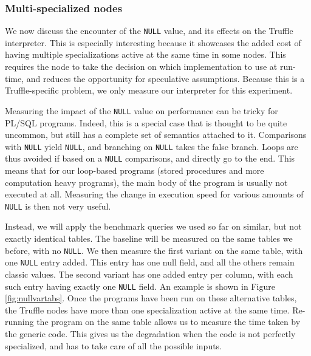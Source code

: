 \documentclass[twoside,11pt,a4paper]{article}
\newcommand{\pls}[1]{\small\texttt{#1}\normalsize}
\newcommand{\plsnull}{\pls{NULL}}
\begin{document}
\subsubsection{Multi-specialized nodes}

We now discuss the encounter of the \plsnull{} value, and its effects on the Truffle interpreter. This is especially interesting because it showcases the added cost of having multiple specializations active at the same time in some nodes. This requires the node to take the decision on which implementation to use at run-time, and reduces the opportunity for speculative assumptions. Because this is a Truffle-specific problem, we only measure our interpreter for this experiment.

Measuring the impact of the \plsnull{} value on performance can be tricky for PL/SQL programs. Indeed, this is a special case that is thought to be quite uncommon, but still has a complete set of semantics attached to it. Comparisons with \plsnull{} yield \plsnull{}, and branching on \plsnull{} takes the false branch. Loops are thus avoided if based on a \plsnull{} comparisons, and directly go to the end. This means that for our loop-based programs (stored procedures and more computation heavy programs), the main body of the program is usually not executed at all. Measuring the change in execution speed for various amounts of \plsnull{} is then not very useful.

Instead, we will apply the benchmark queries we used so far on similar, but not exactly identical tables. The baseline will be measured on the same tables we before, with no \plsnull{}. We then measure the first variant on the same table, with one \plsnull{} entry added. This entry has one null field, and all the others remain classic values. The second variant has one added entry per column, with each such entry having exactly one \plsnull{} field. An example is shown in Figure \ref{fig:nullvartabs}. Once the programs have been run on these alternative tables, the Truffle nodes have more than one specialization active at the same time. Re-running the program on the same table allows us to measure the time taken by the generic code. This gives us the degradation when the code is not perfectly specialized, and has to take care of all the possible inputs.
\end{document}
